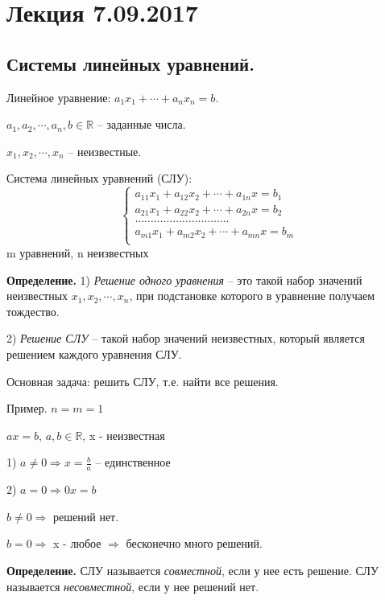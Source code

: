 \section{Лекция 7.09.2017}
\subsection{Системы линейных уравнений.}

Линейное уравнение: $a_1 x_1 + \cdots + a_n x_n = b$.

$a_1, a_2, \cdots, a_n, b \in \mathbb{R}$ -- заданные числа.

$x_1, x_2, \cdots, x_n$ -- неизвестные.

\vspace{\baselineskip}
Система линейных уравнений (СЛУ):
\[
	\left\{
		\begin{aligned}
        a_{11}x_1 + a_{12}x_2 + \cdots + a_{1n}x = b_1 \\
        a_{21}x_1 + a_{22}x_2 + \cdots + a_{2n}x = b_2 \\
        \hdots \hdots \hdots \hdots \hdots \hdots \hdots \hdots \hdots \hdots\\
        a_{m1}x_1 + a_{m2}x_2 + \cdots + a_{mn}x = b_m \\
		\end{aligned}
	\right.
\]
m уравнений, n неизвестных

\vspace{\baselineskip}
\textbf{Определение.} 1) \textit{Решение одного уравнения} -- это такой набор значений неизвестных $x_1, x_2, \cdots, x_n$, при подстановке которого в уравнение получаем тождество.

2) \textit{Решение СЛУ} -- такой набор значений неизвестных, который является решением каждого уравнения СЛУ.

\vspace{\baselineskip}
Основная задача: решить СЛУ, т.е. найти все решения.

\vspace{\baselineskip}
Пример. $n = m = 1$

$ax = b$, $a, b \in \mathbb{R}$, x - неизвестная

1) $a \neq 0 \Rightarrow x = \frac{b}{a}$ -- единственное

2) $a = 0 \Rightarrow 0x = b$

$b \neq 0 \Rightarrow$ решений нет.

$b = 0 \Rightarrow$ x - любое $\Rightarrow$ бесконечно много решений.

\vspace{\baselineskip}
\textbf{Определение.} СЛУ называется \textit{совместной}, если у нее есть решение. СЛУ называется \textit{несовместной}, если у нее решений нет.

